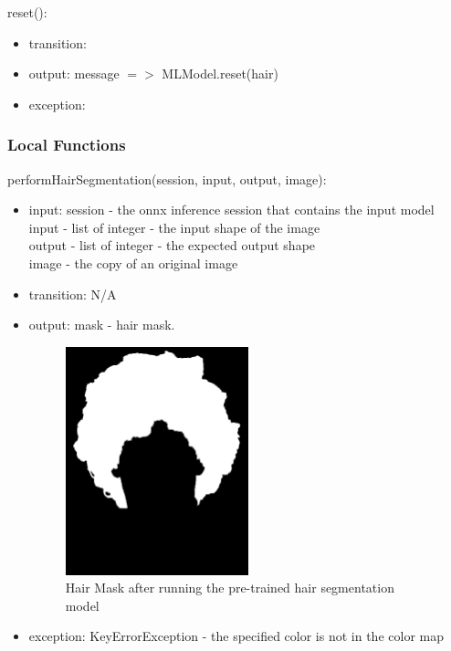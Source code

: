 \documentclass[12pt, titlepage]{article}
\begin{document}
\noindent reset():
\begin{itemize}
\item transition:
\item output: message $=>$ MLModel.reset(hair)
\item exception: 
\end{itemize}

\subsubsection{Local Functions}

\noindent performHairSegmentation(session, input, output, image):
\begin{itemize}
\item input: session  - the onnx inference session that contains the input model\\
input - list of integer - the input shape of the image\\
output - list of integer - the expected output shape\\
image - the copy of an original image
\item transition: N/A
\item output: mask - hair mask.
\begin{center}
\begin{figure}[H]
\includegraphics[width=0.5\textwidth]{Design/SoftDetailedDes/hair_mask.png}
\caption{Hair Mask after running the pre-trained hair segmentation model}
\label{Fig_UseHierarchy} 
\end{figure}
\end{center}
\item exception: KeyErrorException - the specified color is not in the color map
\end{itemize}
\end{document}
